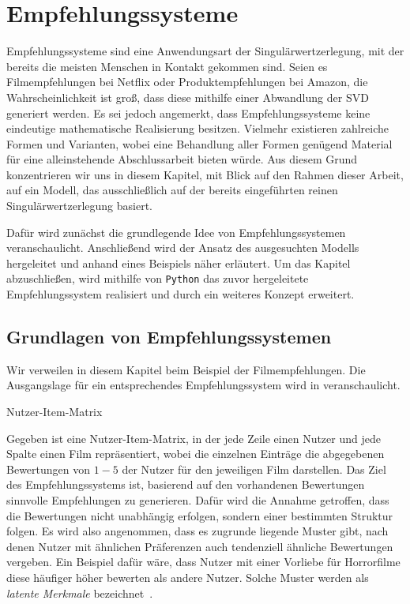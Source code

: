 \chapter{Empfehlungssysteme}\label{chap:rec}

Empfehlungssysteme sind eine Anwendungsart der Singulärwertzerlegung, mit der bereits die meisten Menschen in Kontakt gekommen sind.
Seien es Filmempfehlungen bei Netflix oder Produktempfehlungen bei Amazon, die Wahrscheinlichkeit ist groß, dass diese mithilfe einer Abwandlung der SVD generiert werden.
Es sei jedoch angemerkt, dass Empfehlungssysteme keine eindeutige mathematische Realisierung besitzen.
Vielmehr existieren zahlreiche Formen und Varianten, wobei eine Behandlung aller Formen genügend Material für eine alleinstehende Abschlussarbeit bieten würde.
Aus diesem Grund konzentrieren wir uns in diesem Kapitel, mit Blick auf den Rahmen dieser Arbeit, auf ein Modell, das ausschließlich auf der bereits eingeführten reinen Singulärwertzerlegung basiert.

Dafür wird zunächst die grundlegende Idee von Empfehlungssystemen veranschaulicht.
Anschließend wird der Ansatz des ausgesuchten Modells hergeleitet und anhand eines Beispiels näher erläutert.
Um das Kapitel abzuschließen, wird mithilfe von \texttt{Python} das zuvor hergeleitete Empfehlungssystem realisiert und durch ein weiteres Konzept erweitert.

\section{Grundlagen von Empfehlungssystemen}

Wir verweilen in diesem Kapitel beim Beispiel der Filmempfehlungen.
Die Ausgangslage für ein entsprechendes Empfehlungssystem wird in  veranschaulicht.
\begin{table}[tb]
    \centering
    \caption{Nutzer-Item-Matrix}\label{tab:rec:usit}
    
\end{table}

Gegeben ist eine Nutzer-Item-Matrix, in der jede Zeile einen Nutzer und jede Spalte einen Film repräsentiert, wobei die einzelnen Einträge die abgegebenen Bewertungen von \(1-5\) der Nutzer für den jeweiligen Film darstellen.
Das Ziel des Empfehlungssystems ist, basierend auf den vorhandenen Bewertungen sinnvolle Empfehlungen zu generieren.
Dafür wird die Annahme getroffen, dass die Bewertungen nicht unabhängig erfolgen, sondern einer bestimmten Struktur folgen.
Es wird also angenommen, dass es zugrunde liegende Muster gibt, nach denen Nutzer mit ähnlichen Präferenzen auch tendenziell ähnliche Bewertungen vergeben.
Ein Beispiel dafür wäre, dass Nutzer mit einer Vorliebe für Horrorfilme diese häufiger höher bewerten als andere Nutzer.
Solche Muster werden als \emph{latente Merkmale} bezeichnet~\cite[31]{korenMatrixFactorizationTechniques2009}.

